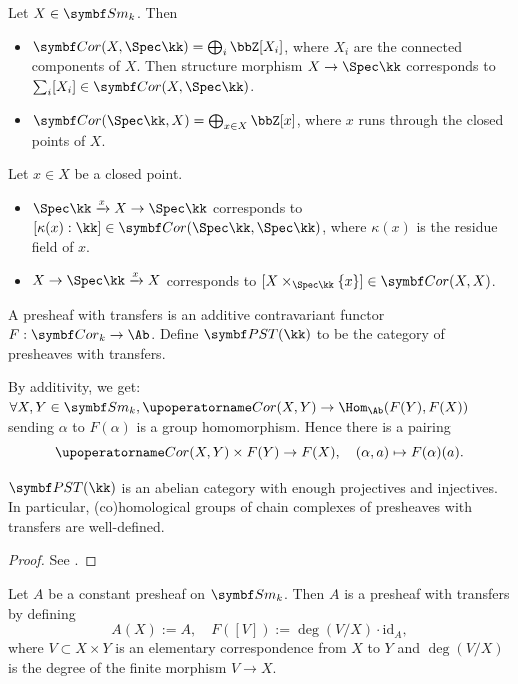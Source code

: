   \begin{example}
    Let $X \in \Sm_k$.
    Then 
    \begin{itemize}
      \item $\Cor(X,\Spec \kk) = \bigoplus_{i} \bbZ [X_i]$, where $X_i$ are the connected components of $X$.
      Then structure morphism $X\to \Spec \kk$ corresponds to $\sum_i [X_i] \in \Cor(X,\Spec \kk)$.

      \item $\Cor(\Spec \kk,X) = \bigoplus_{x\in X} \bbZ [x]$, where $x$ runs through the closed points of $X$.
    \end{itemize}
    Let $x \in X$ be a closed point.
    \begin{itemize}
      \item $\Spec \kk \xrightarrow{x} X \to \Spec \kk$ corresponds to $[\kappa(x):\kk] \in \Cor(\Spec \kk,\Spec \kk)$, where $\kappa(x)$ is the residue field of $x$.
      \item $X \to \Spec \kk \xrightarrow{x} X$ corresponds to $[X \times_{\Spec \kk} \{x\}] \in \Cor(X,X)$.
    \end{itemize}
  \end{example}

  \begin{definition}
    A presheaf with transfers is an additive contravariant functor $F: \Cor_k \to \Ab$.
    Define $\PST(\kk)$ to be the category of presheaves with transfers.
  \end{definition}

  By additivity,  we get: $\forall X,Y\in \Sm_k, \Cone(X,Y) \to \Hom_{\Ab}(F(Y),F(X))$ sending $\alpha$ to $F(\alpha)$ is a group homomorphism.
  Hence there is a pairing
  \[ \Cone(X,Y) \times F(Y) \to F(X),\quad (\alpha,a) \mapsto F(\alpha)(a). \]

  \begin{lemma}
    $\PST(\kk)$ is an abelian category with enough projectives and injectives.
    In particular, (co)homological groups of chain complexes of presheaves with transfers are well-defined.
  \end{lemma}
  \begin{proof}
    See \cite[Section 2.1]{MVW}.
  \end{proof}

  \begin{example}
    Let $A$ be a constant presheaf on $\Sm_k$.
    Then $A$ is a presheaf with transfers by defining 
    \[ A(X) := A, \quad F([V]) := \deg(V/X) \cdot \mathrm{id}_A, \]
    where $V\subset X\times Y$ is an elementary correspondence from $X$ to $Y$ and $\deg(V/X)$ is the degree of the finite morphism $V\to X$.
  \end{example}

